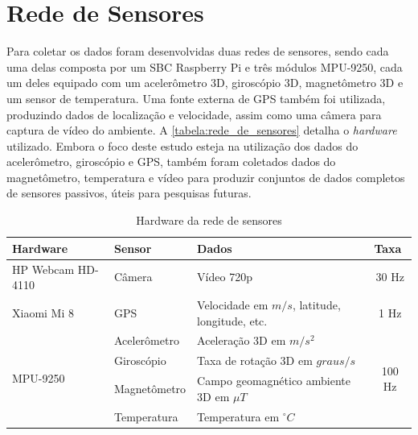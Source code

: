 \section{Rede de Sensores}

Para coletar os dados foram desenvolvidas duas redes de sensores, sendo cada uma delas composta por um SBC Raspberry Pi e três módulos MPU-9250, cada um deles equipado com um acelerômetro 3D, giroscópio 3D, magnetômetro 3D e um sensor de temperatura. Uma fonte externa de GPS também foi utilizada, produzindo dados de localização e velocidade, assim como uma câmera para captura de vídeo do ambiente. A \autoref{tabela:rede_de_sensores} detalha o \textit{hardware} utilizado. Embora o foco deste estudo esteja na utilização dos dados do acelerômetro, giroscópio e GPS, também foram coletados dados do magnetômetro, temperatura e vídeo para produzir conjuntos de dados completos de sensores passivos, úteis para pesquisas futuras.

\begin{table}[h!]
\scriptsize
\caption{Hardware da rede de sensores} 
\label{tabela:rede_de_sensores}
\centering
\begin{tabular}{llll}
\toprule
\multicolumn{1}{l}{\textbf{Hardware}} & 
\multicolumn{1}{l}{\textbf{Sensor}} & 
\multicolumn{1}{l}{\textbf{Dados}} & 
\multicolumn{1}{l}{\textbf{Taxa}}  
\\ \midrule

\multicolumn{1}{l}{HP Webcam HD-4110} & 
\multicolumn{1}{l}{Câmera} & 
\multicolumn{1}{l}{Vídeo 720p} & 
\multicolumn{1}{c}{30 Hz}                   
\\ \midrule

\multicolumn{1}{l}{Xiaomi Mi 8} & 
\multicolumn{1}{l}{GPS} & 
\multicolumn{1}{l}{Velocidade em $m/s$, latitude, longitude, etc.} &
\multicolumn{1}{c}{1 Hz}
\\ \midrule

\multicolumn{1}{l}{\multirow{5}{*}{MPU-9250}} & 
\multicolumn{1}{l}{Acelerômetro} & 
\multicolumn{1}{l}{Aceleração 3D em $m/s^2$} &
\multicolumn{1}{c}{\multirow{5}{*}{100 Hz}} 
\\ \cmidrule(lr){2-3}

\multicolumn{1}{l}{} & 
\multicolumn{1}{l}{Giroscópio} & 
\multicolumn{1}{l}{Taxa de rotação 3D em $graus/s$} & 
\multicolumn{1}{l}{}                       
\\ \cmidrule(lr){2-3}

\multicolumn{1}{l}{} & 
\multicolumn{1}{l}{Magnetômetro} & 
\multicolumn{1}{l}{Campo geomagnético ambiente 3D em $\mu T$} & 
\multicolumn{1}{l}{}
\\ \cmidrule(lr){2-3}

\multicolumn{1}{l}{} & 
\multicolumn{1}{l}{Temperatura} &
\multicolumn{1}{l}{Temperatura em $^{\circ}C$} & 
\multicolumn{1}{l}{}                       
\\ \bottomrule

\end{tabular}
\end{table}


